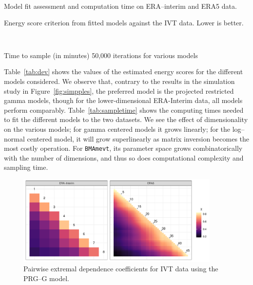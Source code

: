 %   

\begin{table}[t]
    \centering
    \caption{Model fit assessment and computation time on ERA--interim and ERA5 data.}
    \begin{subtable}{0.7\textwidth}
    \centering
    
    \caption{Energy score criterion from fitted models against the IVT data. Lower is better.\label{tab:dev}}
    \end{subtable}
    \\
    \bigskip
    \begin{subtable}{0.7\textwidth}
    \centering
    
    \caption{Time to sample (in minutes) 50,000 iterations for various models\label{tab:sampletime}}
    \end{subtable}%
\end{table}



Table~\ref{tab:dev} shows the values of the estimated energy 
    scores for the different models considered. We observe that, contrary to the results in the
    simulation study in Figure~\ref{fig:simpples}, the preferred model is the projected restricted 
    gamma models, though for the lower-dimensional ERA-Interim data, all models perform comparably.
    Table~\ref{tab:sampletime} shows the computing times needed to fit the different models to the
    two datasets.  We see the effect of dimensionality on the various models; for gamma centered
    models it grows linearly; for the log--normal centered model, it will grow superlinearly as matrix
    inversion becomes the most costly operation.  For \verb|BMAmevt|, its parameter space grows
    combinatorically with the number of dimensions, and thus so does computational complexity and
    sampling time.

\begin{figure}[b]
    \centering
    \includegraphics[width=0.9\textwidth]{./images/chi_ij_c}
    \caption{Pairwise extremal dependence coefficients for IVT data using the PRG--G model.\label{fig:chi_ij}}
\end{figure}


